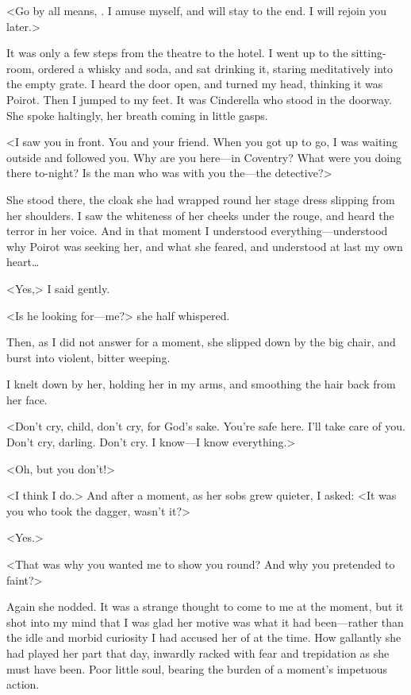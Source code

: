  <Go by all means, . I amuse myself, and will stay to the end. I will rejoin you later.> 

 It was only a few steps from the theatre to the hotel. I went up to the sitting-room, ordered a whisky and soda, and sat drinking it, staring meditatively into the empty grate. I heard the door open, and turned my head, thinking it was Poirot. Then I jumped to my feet. It was Cinderella who stood in the doorway. She spoke haltingly, her breath coming in little gasps. 

 <I saw you in front. You and your friend. When you got up to go, I was waiting outside and followed you. Why are you here—in Coventry? What were you doing there to-night? Is the man who was with you the—the detective?> 

 She stood there, the cloak she had wrapped round her stage dress slipping from her shoulders. I saw the whiteness of her cheeks under the rouge, and heard the terror in her voice. And in that moment I understood everything—understood why Poirot was seeking her, and what she feared, and understood at last my own heart\dots 

 <Yes,> I said gently. 

 <Is he looking for—me?> she half whispered. 

 Then, as I did not answer for a moment, she slipped down by the big chair, and burst into violent, bitter weeping. 

 I knelt down by her, holding her in my arms, and smoothing the hair back from her face. 

 <Don't cry, child, don't cry, for God's sake. You're safe here. I'll take care of you. Don't cry, darling. Don't cry. I know—I know everything.> 

 <Oh, but you don't!> 

 <I think I do.> And after a moment, as her sobs grew quieter, I asked: <It was you who took the dagger, wasn't it?> 

 <Yes.> 

 <That was why you wanted me to show you round? And why you pretended to faint?> 

 Again she nodded. It was a strange thought to come to me at the moment, but it shot into my mind that I was glad her motive was what it had been—rather than the idle and morbid curiosity I had accused her of at the time. How gallantly she had played her part that day, inwardly racked with fear and trepidation as she must have been. Poor little soul, bearing the burden of a moment's impetuous action. 

